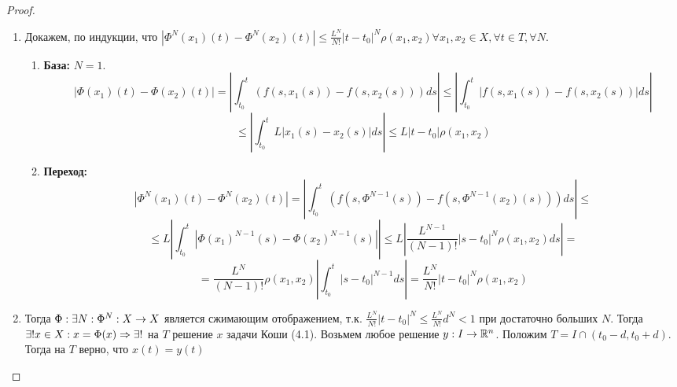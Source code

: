 \begin{proof}
\begin{enumerate}
        Пусть \(\exists t \in T: t > t_0: |x(t) - x_0| > R\). Тогда \(\exists \tau > t_0: |x(\tau) - x_0| > R\) и \(|x(t) - x_0| < R, t \in [t_0, R)\).
        \[|x(\tau) - x_0| = \left| \int_{t_0}^\tau f(s, x(s))sx \right| \le M\int_{t_0}^\tau ds \le Md = R\]
        \item Докажем, по индукции, что \(|\Phi^N(x_1)(t) - \Phi^N(x_2)(t)| \le \frac{L^N}{N!}|t - t_0|^N \rho(x_1, x_2) \forall x_1, x_2 \in X, \forall t \in T, \forall N\).
        \begin{enumerate}
            \item[] \textbf{База:} \(N = 1\).
            \[|\Phi(x_1)(t) - \Phi(x_2)(t)| = \left| \int_{t_0}^t \left( f(s, x_1(s)) - f(s, x_2(s)) \right)ds \right| \le \left| \int_{t_0}^t \left| f(s, x_1(s)) - f(s, x_2(s)) \right|ds \right|\]
            \[\le \left| \int_{t_0}^t L|x_1(s) - x_2(s)|ds \right| \le L|t - t_0|\rho(x_1, x_2)\]
            \item[] \textbf{Переход:}
            \[|\Phi^N(x_1)(t) - \Phi^N(x_2)(t)| = \left| \int_{t_0}^t \left( f(s, \Phi^{N - 1}(s)) - f(s, \Phi^{N - 1}(x_2)(s)) \right)ds \right| \le \]
            \[\le L\left| \int_{t_0}^t |\Phi(x_1)^{N - 1}(s) - \Phi(x_2)^{N - 1}(s)| \right| \le L\left| \frac{L^{N - 1}}{(N - 1)!}|s - t_0|^N\rho(x_1, x_2)ds \right| = \]
            \[= \frac{L^N}{(N - 1)!}\rho(x_1, x_2)\left| \int_{t_0}^t |s - t_0|^{N - 1}ds \right| = \frac{L^N}{N!}|t - t_0|^N\rho(x_1, x_2)\]
        \end{enumerate}

        \item Тогда \(\Phi: \exists N: \Phi^N: X \rightarrow X\) является сжимающим отображением, т.к. \(\frac{L^N}{N!}|t - t_0|^N \le \frac{L^N}{N!}d^N < 1\) при достаточно больших \(N\). Тогда \(\exists! x \in X: x = \Phi(x) \Rightarrow \exists!\) на \(T\) решение \(x\) задачи Коши (4.1). Возьмем любое решение \(y: I \rightarrow \mathbb{R}^n\). Положим \(T = I \cap (t_0 - d, t_0 + d)\). Тогда на \(T\) верно, что \(x(t) = y(t)\)
    \end{enumerate}
\end{proof}

